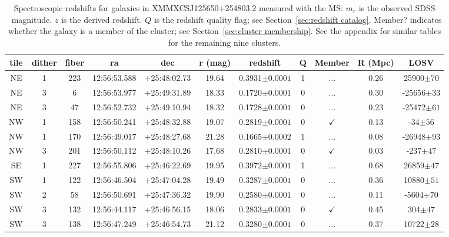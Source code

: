 \begin{table*}
	\centering \caption{Spectroscopic redshifts for galaxies in XMMXCSJ125650+254803.2 measured with the MS: $m_r$ is the observed SDSS \sdssr\ magnitude. $z$ is the derived redshift. $Q$ is the redshift quality flag; see Section~\ref{sec:redshift catalog}. Member? indicates whether the galaxy is a member of the cluster; see Section~\ref{sec:cluster membership}. See the appendix for similar tables for the remaining nine clusters.}
	\begin{tabular}{ccccccccccc}
		\hline
		tile & dither & fiber & ra & dec & r (mag) & redshift & Q & Member & R (Mpc) & LOSV \\
		\hline \hline
NE & 1 & 223 & 12:56:53.588 & +25:48:02.73 & 19.64 & 0.3931$\pm{0.0001}$ & 1 & ... & 0.26 & 25900$\pm{70}$ \\
NE & 3 & 6 & 12:56:53.977 & +25:49:31.89 & 18.33 & 0.1720$\pm{0.0001}$ & 0 & ... & 0.30 & -25656$\pm{33}$ \\
NE & 3 & 47 & 12:56:52.732 & +25:49:10.94 & 18.32 & 0.1728$\pm{0.0001}$ & 0 & ... & 0.23 & -25472$\pm{61}$ \\
NW & 1 & 158 & 12:56:50.241 & +25:48:32.88 & 19.07 & 0.2819$\pm{0.0001}$ & 0 & $\checkmark$ & 0.13 & -34$\pm{56}$ \\
NW & 1 & 170 & 12:56:49.017 & +25:48:27.68 & 21.28 & 0.1665$\pm{0.0002}$ & 1 & ... & 0.08 & -26948$\pm{93}$ \\
NW & 3 & 201 & 12:56:50.112 & +25:48:10.26 & 17.68 & 0.2810$\pm{0.0001}$ & 0 & $\checkmark$ & 0.03 & -237$\pm{47}$ \\
SE & 1 & 227 & 12:56:55.806 & +25:46:22.69 & 19.95 & 0.3972$\pm{0.0001}$ & 1 & ... & 0.68 & 26859$\pm{47}$ \\
SW & 1 & 122 & 12:56:46.504 & +25:47:04.28 & 19.49 & 0.3287$\pm{0.0001}$ & 0 & ... & 0.36 & 10880$\pm{51}$ \\
SW & 2 & 58 & 12:56:50.691 & +25:47:36.32 & 19.90 & 0.2580$\pm{0.0001}$ & 0 & ... & 0.11 & -5604$\pm{70}$ \\
SW & 3 & 132 & 12:56:44.117 & +25:46:56.15 & 18.06 & 0.2833$\pm{0.0001}$ & 0 & $\checkmark$ & 0.45 & 304$\pm{47}$ \\
SW & 3 & 138 & 12:56:47.249 & +25:46:54.73 & 21.12 & 0.3280$\pm{0.0001}$ & 0 & ... & 0.37 & 10722$\pm{28}$ \\
		\hline
	\end{tabular}
	\label{tbl:XMMXCSJ125650+254803.2}
\end{table*}

